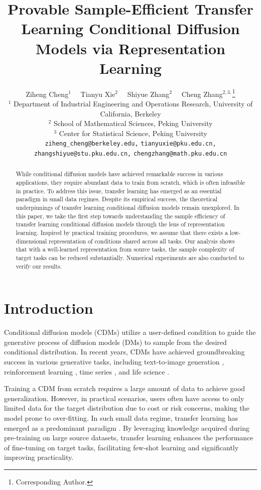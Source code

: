 \documentclass{article}
\title{Provable Sample-Efficient Transfer Learning Conditional Diffusion Models via Representation Learning}
\author{
Ziheng Cheng$^{1}$ \ \ Tianyu Xie$^{2}$ \ \ Shiyue Zhang$^{2}$ \ \ Cheng Zhang$^{2,3,}$\thanks{Corresponding Author.}\\
$^{1}$ Department of Industrial Engineering and Operations Research, University of California, Berkeley\\
$^{2}$ School of Mathematical Sciences, Peking University\\
$^{3}$ Center for Statistical Science, Peking University\\
\texttt{ziheng\_cheng@berkeley.edu,}
\texttt{tianyuxie@pku.edu.cn,}\\
\texttt{zhangshiyue@stu.pku.edu.cn,}
\texttt{chengzhang@math.pku.edu.cn}
}
\numberwithin{equation}{section}
\theoremstyle{definition}
\begin{document}
\maketitle

\begin{abstract}
    While conditional diffusion models have achieved remarkable success in various applications, they require abundant data to train from scratch, which is often infeasible in practice.
    To address this issue, transfer learning has emerged as an essential paradigm in small data regimes.
    Despite its empirical success, the theoretical underpinnings of transfer learning conditional diffusion models remain unexplored.
    In this paper, we take the first step towards understanding the sample efficiency of transfer learning conditional diffusion models through the lens of representation learning.
    Inspired by practical training procedures, we assume that there exists a low-dimensional representation of conditions shared across all tasks.
    Our analysis shows that with a well-learned representation from source tasks, the sample
    complexity of target tasks can be reduced substantially.
    Numerical experiments are also conducted to verify our results.
\end{abstract}

\section{Introduction}

Conditional diffusion models (CDMs) utilize a user-defined condition to guide the generative process of diffusion models (DMs) to sample from the desired conditional distribution.
In recent years, CDMs have achieved groundbreaking success in various generative tasks, including text-to-image generation \citep{ho2020denoising,song2020score,ho2022classifier,rombach2022high}, reinforcement learning \citep{janner2022planning,chi2023diffusion,wang2022diffusion,reuss2023goal}, time series \citep{tashiro2021csdi,rasul2021autoregressive}, and life science \citep{song2021solving,watson2022broadly,gruver2024protein,guo2024diffusion}. 

Training a CDM from scratch requires a large amount of data to achieve good generalization.
However, in practical scenarios, users often have access to only limited data for the target distribution due to cost or risk concerns, making the model prone to over-fitting. 
In such small data regime, transfer learning has emerged as a predominant paradigm \citep{moon2022fine,ruiz2023dreambooth,xie2023difffit,han2023svdiff}.
By leveraging knowledge acquired during pre-training on large source datasets, transfer learning enhances the performance of fine-tuning on target tasks, facilitating few-shot learning and significantly improving practicality.
\end{document}
